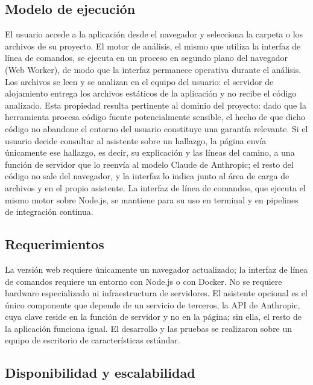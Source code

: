 \subsection{Modelo de ejecución}\label{sec:n4.4.1}

El usuario accede a la aplicación desde el navegador y selecciona la carpeta o los archivos de su proyecto. El motor de análisis, el mismo que utiliza la interfaz de línea de comandos, se ejecuta en un proceso en segundo plano del navegador (Web Worker), de modo que la interfaz permanece operativa durante el análisis. Los archivos se leen y se analizan en el equipo del usuario: el servidor de alojamiento entrega los archivos estáticos de la aplicación y no recibe el código analizado. Esta propiedad resulta pertinente al dominio del proyecto: dado que la herramienta procesa código fuente potencialmente sensible, el hecho de que dicho código no abandone el entorno del usuario constituye una garantía relevante. Si el usuario decide consultar al asistente sobre un hallazgo, la página envía únicamente ese hallazgo, es decir, su explicación y las líneas del camino, a una función de servidor que lo reenvía al modelo Claude de Anthropic; el resto del código no sale del navegador, y la interfaz lo indica junto al área de carga de archivos y en el propio asistente. La interfaz de línea de comandos, que ejecuta el mismo motor sobre Node.js, se mantiene para su uso en terminal y en pipelines de integración continua.

\subsection{Requerimientos}\label{sec:n4.4.2}

La versión web requiere únicamente un navegador actualizado; la interfaz de línea de comandos requiere un entorno con Node.js o con Docker. No se requiere hardware especializado ni infraestructura de servidores. El asistente opcional es el único componente que depende de un servicio de terceros, la API de Anthropic, cuya clave reside en la función de servidor y no en la página; sin ella, el resto de la aplicación funciona igual. El desarrollo y las pruebas se realizaron sobre un equipo de escritorio de características estándar.

\subsection{Disponibilidad y escalabilidad}\label{sec:n4.4.3}

